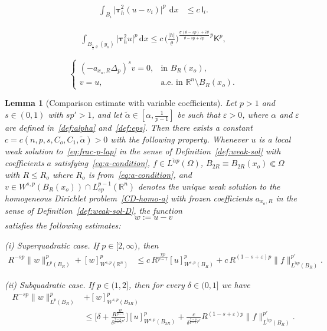 \documentclass[10pt,a4paper]{amsart}
\newtheorem{lemma}{Lemma}
\newcommand{\R}{\ensuremath{\mathbb{R}}}
\renewcommand{\d}{\:\! \mathrm{d}}
\newcommand{\dx}{\mathrm{d}x}
\renewcommand{\epsilon}{\varepsilon}
\renewcommand{\rho}{\varrho}
\newcommand\sfI{{\boldsymbol{\mathsf I}}}
\newcommand\sfK{{\boldsymbol{\mathsf K}}}
\begin{document}
\begin{align}\label{change-1<}
    \int_{B_i} \big|\boldsymbol\tau_h^2 (u - v_i)\big|^p \,\d x 
    &\le 
    c\,\sfI_i.
\end{align}  

\begin{align}\label{sstep1}
    \int_{B_{\frac12 \rho}(y_o)} \big|\boldsymbol\tau_h^2 u\big|^p \,\dx
    \le
    c\, \Big(\frac{|h|}{\rho}\Big)^{\frac{\sigma(\theta-sp)+\bar\epsilon\theta}{\theta-sp+\bar\epsilon p}\, p}
    \sfK^p,
\end{align}

\begin{equation}\label{CD-homo-a} 
\left\{
    \begin{array}{cl}
      (- a_{x_o,R}\Delta_p)^s v  = 0, & \mbox{in $B_R(x_o)$,} \\[6pt]
      v = u, & \mbox{a.e.~in $\R^n \setminus B_R(x_o)$.}
    \end{array}
\right.
\end{equation}

\begin{lemma}[Comparison estimate with variable coefficients]\label{lem:compar-var-coeff}
Let $p>1$ and $s\in(0,1)$ with $sp'>1$, and let $\tilde\alpha\in[\alpha,\frac{1}{p-1}]$ be such that $\epsilon>0$, where $\alpha$ and $\epsilon$ are defined in~\eqref{def:alpha} and~\eqref{def:eps}.
Then there exists a constant 
$c=c(n,p,s,C_o,C_1,\tilde\alpha)>0$ with the following property. 
Whenever $u$ is a local weak solution to~\eqref{eq:frac-p-lap} in the sense of Definition~\ref{def:weak-sol} with coefficients $a$ satisfying~\eqref{eq:a-condition}, $f\in L^{\tilde\alpha p}(\Omega)$, $B_{2R}\equiv B_{2R}(x_o)\Subset\Omega$ with $R \leq R_o$ where $R_o$ is from~\eqref{eq:a-condition}, and $v\in W^{s,p}(B_R(x_o)) \cap L^{p-1}_{sp}(\R^n)$ denotes the unique weak solution to the homogeneous Dirichlet problem~\eqref{CD-homo-a} with frozen coefficients $a_{x_o,R}$ in the sense of Definition~\ref{def:weak-sol-D}, the function
\[
w := u-v
\]
satisfies the following estimates:


\medskip
\noindent
\emph{(i) Superquadratic case.} 
If $p\in[2,\infty)$, then
\begin{align*}
    R^{-sp}\|w\|_{L^p(B_R)}^p + [w]_{W^{s,p}(\R^n)}^p
    &\leq 
    c\,R^{\frac{\chi p}{p-1}}[u]^p_{W^{s,p}(B_R)} +
    c\, R^{(1-s+\epsilon)p} \|f\|_{L^{\tilde\alpha p}(B_R)}^{p'}.
\end{align*}

\medskip
\noindent
\emph{(ii) Subquadratic case.} 
If $p\in(1,2]$,  then for every $\delta\in(0,1]$ we have
\begin{align*}
    R^{-sp}\|w\|_{L^p(B_R)}^p &+ [w]^p_{W^{s,p}(B_{2R})}\\
    &\le 
    \bigg[\delta 
     +
     \frac{R^{\frac{\chi p}{p-1}}}{\delta^{\frac{2-p}{p-1}p'}} \bigg]
     [u]_{W^{s,p}(B_{2R})}^p 
     + 
     \frac{c}{\delta^{\frac{2-p}{p-1}p'}} 
     R^{(1-s+\epsilon)p}
    \|f\|_{L^{\tilde\alpha p}(B_R)}^{p'} .
\end{align*}
\end{lemma}
\end{document}
